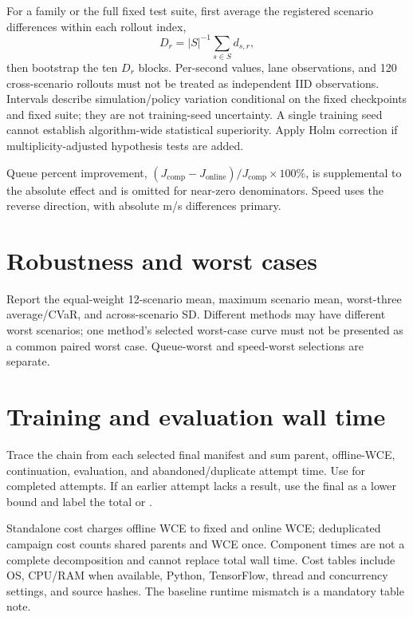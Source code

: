 For a family or the full fixed test suite, first average the registered scenario differences within each rollout index,
\[
D_r=|S|^{-1}\sum_{s\in S}d_{s,r},
\]
then bootstrap the ten $D_r$ blocks. Per-second values, lane observations, and 120 cross-scenario rollouts must not be treated as independent IID observations. Intervals describe simulation/policy variation conditional on the fixed checkpoints and fixed suite; they are not training-seed uncertainty. A single training seed cannot establish algorithm-wide statistical superiority. Apply Holm correction if multiplicity-adjusted hypothesis tests are added.

Queue percent improvement, $(J_{\mathrm{comp}}-J_{\mathrm{online}})/J_{\mathrm{comp}}\times100\%$, is supplemental to the absolute effect and is omitted for near-zero denominators. Speed uses the reverse direction, with absolute m/s differences primary.

\section{Robustness and worst cases}
Report the equal-weight 12-scenario mean, maximum scenario mean, worst-three average/CVaR, and across-scenario SD. Different methods may have different worst scenarios; one method's selected worst-case curve must not be presented as a common paired worst case. Queue-worst and speed-worst selections are separate.

\section{Training and evaluation wall time}
Trace the  chain from each selected final manifest and sum parent, offline-WCE, continuation, evaluation, and abandoned/duplicate attempt time. Use  for completed attempts. If an earlier attempt lacks a result, use the final  as a lower bound and label the total  or .

Standalone cost charges offline WCE to fixed and online WCE; deduplicated campaign cost counts shared parents and WCE once. Component times are not a complete decomposition and cannot replace total wall time. Cost tables include OS, CPU/RAM when available, Python, TensorFlow, thread and concurrency settings, and source hashes. The baseline runtime mismatch is a mandatory table note.
